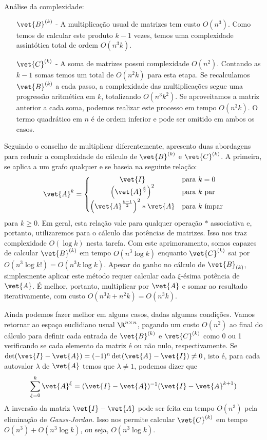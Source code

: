 \documentclass[l15, tikzdraw]{homework}
\begin{document}
	\subsubquest%
	Análise da complexidade:
	\begin{itemize}
		\item [$\vet{B}^{(k)}$ -] A multiplicação usual de matrizes tem custo $O(n^3)$. Como temos de calcular este produto $k - 1$ vezes, temos uma complexidade assintótica total de ordem $O(n^3 k)$.
		
		\item [$\vet{C}^{(k)}$ -] A soma de matrizes possui complexidade $O(n^2)$. Contando as $k - 1$ somas temos um total de $O(n^2 k)$ para esta etapa. Se recalculamos $\vet{B}^{(k)}$ a cada passo, a complexidade das multiplicações segue uma progressão aritmética em $k$, totalizando $O(n^3 k^2)$. Se aproveitamos a matriz anterior a cada soma, podemos realizar este processo em tempo  $O(n^3 k)$. O termo quadrático em $n$ é de ordem inferior e pode ser omitido em ambos os casos.
	\end{itemize}
	
	\subsubquest%
	Seguindo o conselho de multiplicar diferentemente, apresento duas abordagens para reduzir a complexidade do cálculo de $\vet{B}^{(k)}$ e $\vet{C}^{(k)}$. A primeira, se aplica a um grafo qualquer e se baseia na seguinte relação:
		$$\vet{A}^k = \left\{\begin{array}{@{}cl@{}}
			\vet{I} &\text{para } k = 0\\
			\left(\vet{A}^{\frac{k}{2}}\right)^2 &\text{para } k \text{ par}\\
			\left(\vet{A}^{\frac{k - 1}{2}}\right)^2 \ast \vet{A} &\text{para } k \text{ ímpar}
		\end{array}\right.$$
	para $k \ge 0$. Em geral, esta relação vale para qualquer operação $\ast$ associativa e, portanto, utilizaremos para o cálculo das potências de matrizes. Isso nos traz complexidade $O(\log k)$ nesta tarefa. Com este aprimoramento, somos capazes de calcular $\vet{B}^{(k)}$ em tempo $O(n^3 \log k)$ enquanto $\vet{C}^{(k)}$ sai por $O(n^3 \log k!) = O(n^3 k \log k)$. Apesar do ganho no cálculo de $\vet{B}_{(k)}$, simplesmente aplicar este método requer calcular cada $\xi$-ésima potência de $\vet{A}$. É melhor, portanto, multiplicar por $\vet{A}$ e somar ao resultado iterativamente, com custo $O(n^3 k + n^2 k) = O(n^3 k)$.\par

	Ainda podemos fazer melhor em alguns casos, dadas algumas condições. Vamos retornar ao espaço euclidiano usual $\R^{n \times n}$, pagando um custo $O(n^2)$ ao final do cálculo para definir cada entrada de $\vet{B}^{(k)}$ e $\vet{C}^{(k)}$ como 0 ou 1 verificando se cada elemento da matriz é ou não nulo, respectivamente. Se $\det (\vet{I} - \vet{A}) = (-1)^n \det (\vet{A} - \vet{I}) \neq 0$, isto é, para cada autovalor $\lambda$ de $\vet{A}$ temos que $\lambda \neq 1$, podemos dizer que
		$$\sum_{\xi = 0}^{k} \vet{A}^\xi = (\vet{I} - \vet{A})^{-1} (\vet{I} - \vet{A}^{k + 1})$$
	A inversão da matriz $\vet{I} - \vet{A}$ pode ser feita em tempo $O(n^3)$ pela eliminação de \textit{Gauss-Jordan}. Isso nos permite calcular $\vet{C}^{(k)}$ em tempo $O(n^3) + O(n^3 \log k)$, ou seja, $O(n^3 \log k)$.\par
\end{document}
